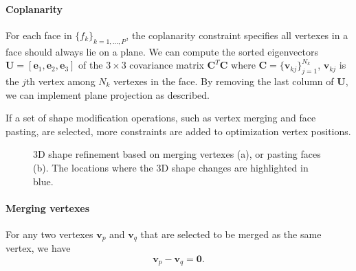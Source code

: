 \paragraph{Coplanarity} {For each face in  $\{f_k\}_{k=1,\dots,P}$, the coplanarity constraint specifies all vertexes in a face should always lie on a plane. 
We can compute the sorted eigenvectors $\mathbf{U} = [\mathbf{e}_1, \mathbf{e}_2, \mathbf{e}_3]$ of the $ 3 \times 3$ covariance matrix $\mathbf{C}^T\mathbf{C}$ where $\mathbf{C} = \{\mathbf{v}_{kj}\}_{j=1}^{N_k}$, $\mathbf{v}_{kj}$ is the $j$th vertex among $N_k$ vertexes in the face. By removing the last column of $\mathbf{U}$, we can implement plane projection as \cite{Bouaziz:2012:SSD:2346796.2346802} described.


If a set of shape modification operations, such as vertex merging and face pasting, are selected, more constraints are added to optimization vertex positions. 
%

\begin{figure}
	\centering
	\caption{3D shape refinement based on merging vertexes (a), or pasting faces (b). The locations where the 3D shape changes are highlighted in blue.  }
	\label{fig:shaperefinement}
\end{figure}

\paragraph{Merging vertexes} 
For any two vertexes $\mathbf{v}_p$ and $\mathbf{v}_q$ that are selected to be merged as the same vertex, we have 
\begin{equation}
\mathbf{v}_p - \mathbf{v}_q = \mathbf{0}.
\label{equ:point}
\end{equation}

}
